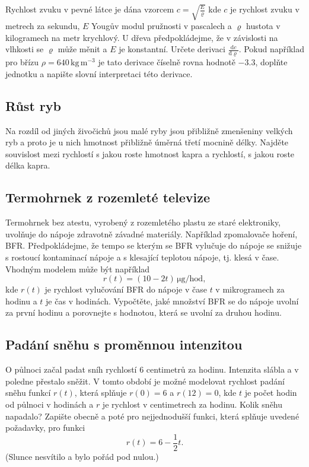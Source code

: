 Rychlost zvuku v pevné látce je dána vzorcem $c=\sqrt{\frac E\varrho}$ kde $c$ je rychlost zvuku v metrech za sekundu, $E$ Yougův modul pružnosti v pascalech a $\varrho$ hustota v kilogramech na metr krychlový. U dřeva předpokládejme, že v závislosti na vlhkosti se $\varrho$ může měnit a $E$ je konstantní. Určete derivaci $\frac{\mathrm dc}{\mathrm d\varrho}$. Pokud například pro břízu $\rho = 640 \,\mathrm{kg}\,\mathrm{m}^{-3}$ je tato derivace číselně rovna hodnotě $-3.3$, doplňte jednotku a napište slovní interpretaci této derivace.

\subsection{Růst ryb}

Na rozdíl od jiných živočichů jsou malé ryby jsou přibližně zmenšeniny
    velkých ryb a proto je u nich hmotnost přibližně úměrná třetí mocnině
    délky. Najděte souvislost mezi rychlostí s jakou roste hmotnost kapra a
    rychlostí, s jakou roste délka kapra.



\subsection{Termohrnek z rozemleté televize}    
Termohrnek bez atestu, vyrobený z rozemletého plastu ze staré
elektroniky, uvolňuje do nápoje zdravotně závadné materiály.
Například zpomalovače hoření, BFR. Předpokládejme, že tempo se kterým
se BFR vylučuje do nápoje se snižuje s rostoucí kontaminací nápoje a s
klesající teplotou nápoje, tj. klesá v čase. Vhodným modelem může být
například
    $$r(t)=(10-2t) \,\mathrm{\mu g}/\mathrm{hod},$$ kde $r(t)$ je rychlost vylučování
    BFR do nápoje v čase $t$ v mikrogramech za hodinu a $t$ je čas v hodinách. Vypočtěte, jaké množství
    BFR se do nápoje uvolní za první hodinu a porovnejte s
    hodnotou, která se uvolní za druhou hodinu.


    \subsection{Padání sněhu s proměnnou intenzitou}

    O půlnoci začal padat sníh rychlostí $6$ centimetrů za hodinu. Intenzita
    slábla a v poledne přestalo sněžit. V tomto období je možné modelovat
    rychlost padání sněhu funkcí $r(t)$, která splňuje $r(0)=6$ a
    $r(12)=0$, kde $t$ je počet hodin od půlnoci v
    hodinách a $r$ je rychlost v centimetrech za hodinu. Kolik sněhu napadalo? Zapište obecně a poté pro nejjednodušší funkci, která splňuje uvedené požadavky, pro funkci $$r(t)=6-\frac 12 t.$$
    (Slunce nesvítilo a bylo pořád pod nulou.)


